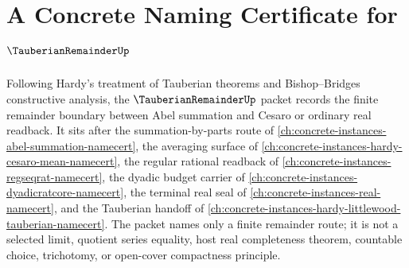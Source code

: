 \chapter{A Concrete Naming Certificate for $\TauberianRemainderUp$}
\label{ch:concrete-instances-tauberian-remainder-namecert}

Following Hardy's treatment of Tauberian theorems and Bishop--Bridges constructive analysis, the $\TauberianRemainderUp$ packet records the finite remainder boundary between Abel summation and Cesaro or ordinary real readback. It sits after the summation-by-parts route of \autoref{ch:concrete-instances-abel-summation-namecert}, the averaging surface of \autoref{ch:concrete-instances-hardy-cesaro-mean-namecert}, the regular rational readback of \autoref{ch:concrete-instances-regseqrat-namecert}, the dyadic budget carrier of \autoref{ch:concrete-instances-dyadicratcore-namecert}, the terminal real seal of \autoref{ch:concrete-instances-real-namecert}, and the Tauberian handoff of \autoref{ch:concrete-instances-hardy-littlewood-tauberian-namecert}. The packet names only a finite remainder route; it is not a selected limit, quotient series equality, host real completeness theorem, countable choice, trichotomy, or open-cover compactness principle.

